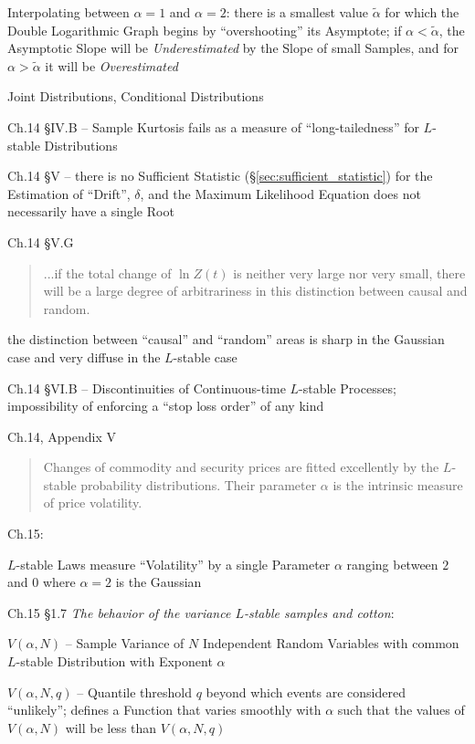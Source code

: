 Interpolating between $\alpha = 1$ and $\alpha = 2$: there is a smallest value
$\tilde{\alpha}$ for which the Double Logarithmic Graph begins by
``overshooting'' its Asymptote; if $\alpha < \tilde{\alpha}$, the Asymptotic
Slope will be \emph{Underestimated} by the Slope of small Samples, and for
$\alpha > \tilde{\alpha}$ it will be \emph{Overestimated}

Joint Distributions, Conditional Distributions

Ch.14 \S IV.B -- Sample Kurtosis fails as a measure of ``long-tailedness'' for
$L$-stable Distributions

Ch.14 \S V -- there is no Sufficient Statistic
(\S\ref{sec:sufficient_statistic}) for the Estimation of ``Drift'', $\delta$,
and the Maximum Likelihood Equation does not necessarily have a single Root

Ch.14 \S V.G

\begin{quote}
  ...if the total change of $\ln Z(t)$ is neither very large nor very small,
  there will be a large degree of arbitrariness in this distinction between
  causal and random.
\end{quote}

the distinction between ``causal'' and ``random'' areas is sharp in the Gaussian
case and very diffuse in the $L$-stable case

Ch.14 \S VI.B -- Discontinuities of Continuous-time $L$-stable Processes;
impossibility of enforcing a ``stop loss order'' of any kind

Ch.14, Appendix V

\begin{quote}
  Changes of commodity and security prices are fitted excellently by the
  $L$-stable probability distributions. Their parameter $\alpha$ is the
  intrinsic measure of price volatility.
\end{quote}

Ch.15:

$L$-stable Laws measure ``Volatility'' by a single Parameter $\alpha$ ranging
between $2$ and $0$ where $\alpha = 2$ is the Gaussian

Ch.15 \S 1.7 \emph{The behavior of the variance $L$-stable samples and cotton}:

$V(\alpha, N)$ -- Sample Variance of $N$ Independent Random Variables with
common $L$-stable Distribution with Exponent $\alpha$

$V(\alpha, N, q)$ -- Quantile threshold $q$ beyond which events are considered
``unlikely''; defines a Function that varies smoothly with $\alpha$ such that
the values of $V(\alpha, N)$ will be less than $V(\alpha, N, q)$


